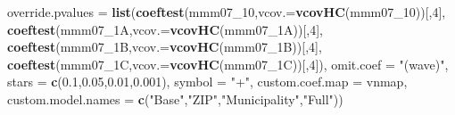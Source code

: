 \documentclass[
]{article}
\newenvironment{Shaded}{\begin{snugshade}}{\end{snugshade}}
\newcommand{\DataTypeTok}[1]{\textcolor[rgb]{0.13,0.29,0.53}{#1}}
\newcommand{\DecValTok}[1]{\textcolor[rgb]{0.00,0.00,0.81}{#1}}
\newcommand{\FloatTok}[1]{\textcolor[rgb]{0.00,0.00,0.81}{#1}}
\newcommand{\KeywordTok}[1]{\textcolor[rgb]{0.13,0.29,0.53}{\textbf{#1}}}
\newcommand{\NormalTok}[1]{#1}
\newcommand{\StringTok}[1]{\textcolor[rgb]{0.31,0.60,0.02}{#1}}
\begin{document}
\begin{Shaded}
\begin{Highlighting}[]
          \DataTypeTok{override.pvalues =} \KeywordTok{list}\NormalTok{(}\KeywordTok{coeftest}\NormalTok{(mmm07_}\DecValTok{10}\NormalTok{,}\DataTypeTok{vcov.=}\KeywordTok{vcovHC}\NormalTok{(mmm07_}\DecValTok{10}\NormalTok{))[,}\DecValTok{4}\NormalTok{],}
                                  \KeywordTok{coeftest}\NormalTok{(mmm07_1A,}\DataTypeTok{vcov.=}\KeywordTok{vcovHC}\NormalTok{(mmm07_1A))[,}\DecValTok{4}\NormalTok{],}
                                  \KeywordTok{coeftest}\NormalTok{(mmm07_1B,}\DataTypeTok{vcov.=}\KeywordTok{vcovHC}\NormalTok{(mmm07_1B))[,}\DecValTok{4}\NormalTok{],}
                                  \KeywordTok{coeftest}\NormalTok{(mmm07_1C,}\DataTypeTok{vcov.=}\KeywordTok{vcovHC}\NormalTok{(mmm07_1C))[,}\DecValTok{4}\NormalTok{]),}
          \DataTypeTok{omit.coef =} \StringTok{"(wave)"}\NormalTok{, }\DataTypeTok{stars =} \KeywordTok{c}\NormalTok{(}\FloatTok{0.1}\NormalTok{,}\FloatTok{0.05}\NormalTok{,}\FloatTok{0.01}\NormalTok{,}\FloatTok{0.001}\NormalTok{), }\DataTypeTok{symbol =} \StringTok{"+"}\NormalTok{,}
          \DataTypeTok{custom.coef.map =}\NormalTok{ vnmap, }
          \DataTypeTok{custom.model.names =} \KeywordTok{c}\NormalTok{(}\StringTok{"Base"}\NormalTok{,}\StringTok{"ZIP"}\NormalTok{,}\StringTok{"Municipality"}\NormalTok{,}\StringTok{"Full"}\NormalTok{))}
\end{Highlighting}
\end{Shaded}
\end{document}
